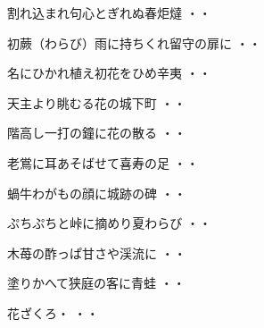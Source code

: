 \begin{shiika}割れ込まれ句心とぎれぬ春炬燵
\hfill{・・}\end{shiika}
\vspace{0.6cm}
\begin{shiika}初蕨（わらび）雨に持ちくれ留守の扉に
\hfill{・・}\end{shiika}
\vspace{0.6cm}
\begin{shiika}名にひかれ植え初花をひめ辛夷
\hfill{・・}\end{shiika}
\vspace{0.6cm}
\begin{shiika}天主より眺むる花の城下町
\hfill{・・}\end{shiika}
\vspace{0.6cm}
\begin{shiika}階高し一打の鐘に花の散る
\hfill{・・}\end{shiika}
\vspace{0.6cm}
\begin{shiika}老鴬に耳あそばせて喜寿の足
\hfill{・・}\end{shiika}
\vspace{0.6cm}
\begin{shiika}蝸牛わがもの顔に城跡の碑
\hfill{・・}\end{shiika}
\vspace{0.6cm}
\begin{shiika}ぷちぷちと峠に摘めり夏わらび
\hfill{・・}\end{shiika}
\vspace{0.6cm}
\begin{shiika}木苺の酢っぱ甘さや渓流に
\hfill{・・}\end{shiika}
\vspace{0.6cm}
\begin{shiika}塗りかへて狭庭の客に青蛙
\hfill{・・}\end{shiika}
\vspace{0.6cm}
\begin{shiika}花ざくろ・
\hfill{・・}\end{shiika}
\vspace{0.6cm}
